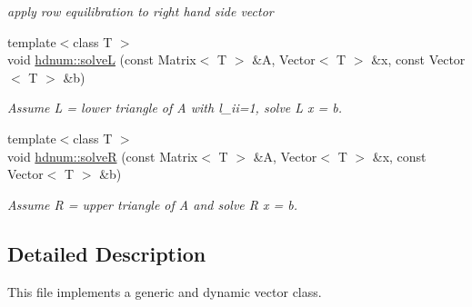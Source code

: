 \begin{DoxyCompactItemize}
\begin{DoxyCompactList}\small\item\em apply row equilibration to right hand side vector \item\end{DoxyCompactList}\item 
\hypertarget{namespacehdnum_aa42c82a5eef72648e2efc763d0fffdf7}{
{\footnotesize template$<$class T $>$ }\\void \hyperlink{namespacehdnum_aa42c82a5eef72648e2efc763d0fffdf7}{hdnum::solveL} (const Matrix$<$ T $>$ \&A, Vector$<$ T $>$ \&x, const Vector$<$ T $>$ \&b)}
\label{namespacehdnum_aa42c82a5eef72648e2efc763d0fffdf7}

\begin{DoxyCompactList}\small\item\em Assume L = lower triangle of A with l\_\-ii=1, solve L x = b. \item\end{DoxyCompactList}\item 
\hypertarget{namespacehdnum_af2ae9ec295b3fbb3b0ac694e21ab2863}{
{\footnotesize template$<$class T $>$ }\\void \hyperlink{namespacehdnum_af2ae9ec295b3fbb3b0ac694e21ab2863}{hdnum::solveR} (const Matrix$<$ T $>$ \&A, Vector$<$ T $>$ \&x, const Vector$<$ T $>$ \&b)}
\label{namespacehdnum_af2ae9ec295b3fbb3b0ac694e21ab2863}

\begin{DoxyCompactList}\small\item\em Assume R = upper triangle of A and solve R x = b. \item\end{DoxyCompactList}\end{DoxyCompactItemize}


\subsection{Detailed Description}
This file implements a generic and dynamic vector class. 